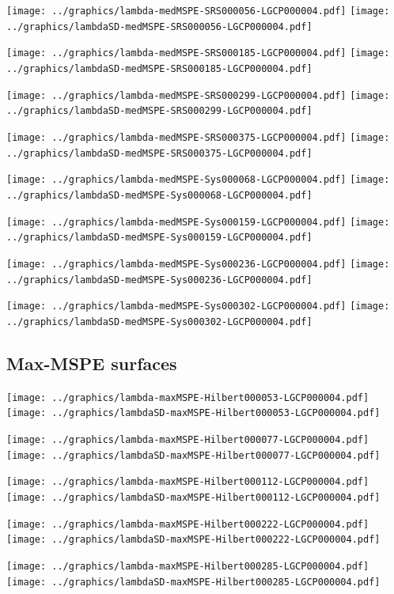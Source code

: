 \documentclass[review]{elsarticle}
\begin{document}
\texttt{[image: ../graphics/lambda-medMSPE-SRS000056-LGCP000004.pdf]}
\texttt{[image: ../graphics/lambdaSD-medMSPE-SRS000056-LGCP000004.pdf]}

\texttt{[image: ../graphics/lambda-medMSPE-SRS000185-LGCP000004.pdf]}
\texttt{[image: ../graphics/lambdaSD-medMSPE-SRS000185-LGCP000004.pdf]}

\texttt{[image: ../graphics/lambda-medMSPE-SRS000299-LGCP000004.pdf]}
\texttt{[image: ../graphics/lambdaSD-medMSPE-SRS000299-LGCP000004.pdf]}

\texttt{[image: ../graphics/lambda-medMSPE-SRS000375-LGCP000004.pdf]}
\texttt{[image: ../graphics/lambdaSD-medMSPE-SRS000375-LGCP000004.pdf]}

\texttt{[image: ../graphics/lambda-medMSPE-Sys000068-LGCP000004.pdf]}
\texttt{[image: ../graphics/lambdaSD-medMSPE-Sys000068-LGCP000004.pdf]}

\texttt{[image: ../graphics/lambda-medMSPE-Sys000159-LGCP000004.pdf]}
\texttt{[image: ../graphics/lambdaSD-medMSPE-Sys000159-LGCP000004.pdf]}

\texttt{[image: ../graphics/lambda-medMSPE-Sys000236-LGCP000004.pdf]}
\texttt{[image: ../graphics/lambdaSD-medMSPE-Sys000236-LGCP000004.pdf]}

\texttt{[image: ../graphics/lambda-medMSPE-Sys000302-LGCP000004.pdf]}
\texttt{[image: ../graphics/lambdaSD-medMSPE-Sys000302-LGCP000004.pdf]}

\subsection{Max-MSPE surfaces}

\texttt{[image: ../graphics/lambda-maxMSPE-Hilbert000053-LGCP000004.pdf]}
\texttt{[image: ../graphics/lambdaSD-maxMSPE-Hilbert000053-LGCP000004.pdf]}

\texttt{[image: ../graphics/lambda-maxMSPE-Hilbert000077-LGCP000004.pdf]}
\texttt{[image: ../graphics/lambdaSD-maxMSPE-Hilbert000077-LGCP000004.pdf]}

\texttt{[image: ../graphics/lambda-maxMSPE-Hilbert000112-LGCP000004.pdf]}
\texttt{[image: ../graphics/lambdaSD-maxMSPE-Hilbert000112-LGCP000004.pdf]}

\texttt{[image: ../graphics/lambda-maxMSPE-Hilbert000222-LGCP000004.pdf]}
\texttt{[image: ../graphics/lambdaSD-maxMSPE-Hilbert000222-LGCP000004.pdf]}

\texttt{[image: ../graphics/lambda-maxMSPE-Hilbert000285-LGCP000004.pdf]}
\texttt{[image: ../graphics/lambdaSD-maxMSPE-Hilbert000285-LGCP000004.pdf]}
\end{document}
